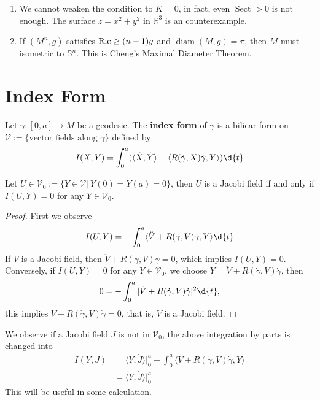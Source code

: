 \begin{rem}
    \begin{enumerate}[(1)]
        \item We cannot weaken the condition to $K=0$, in fact, even $\operatorname{Sect}>0$ is not enough.
        The surface $z=x^2+y^2$ in $\mathbb{R}^3$ is an counterexample.
        \item If $(M^n,g)$ satisfies $\operatorname{Ric}\geq(n-1)g$ and $\operatorname{diam}(M,g)=\pi$, then $M$ must isometric to $\mathbb{S}^n$.
        This is Cheng's Maximal Diameter Theorem.
    \end{enumerate}
\end{rem}

\section{Index Form}

\begin{defn}
    Let $\gamma:[0,a]\to M$ be a geodesic.
    The \textbf{index form} of $\gamma$ is a biliear form on $\mathscr{V}:=\{\text{vector fields along }\gamma\}$ defined by
    \[I(X,Y)=\int_0^a(\langle\dot{X},\dot{Y}\rangle-\langle R(\dot{\gamma},{X})\dot{\gamma},{Y}\rangle)\d{t}\]
\end{defn}

\begin{lem}\label{jacobi field and index form}
    Let $U\in\mathscr{V}_0:=\{Y\in\mathscr{V}|\ Y(0)=Y(a)=0\}$, then $U$ is a Jacobi field if and only if $I(U,Y)=0$ for any $Y\in\mathscr{V}_0$.
\end{lem}
\begin{proof}
    First we observe
    \[I(U,Y)=-\int_0^a\langle\ddot{V}+R(\dot{\gamma},V)\dot{\gamma},Y\rangle\d{t}\]
    If $V$ is a Jacobi field, then $\ddot{V}+R(\dot{\gamma},V)\dot{\gamma}=0$, which implies $I(U,Y)=0$.
    Conversely, if $I(U,Y)=0$ for any $Y\in\mathscr{V}_0$, we choose $Y=\ddot{V}+R(\dot{\gamma},V)\dot{\gamma}$, then
    \[0=-\int_0^a|\ddot{V}+R(\dot{\gamma},V)\dot{\gamma}|^2\d{t},\]
    this implies $\ddot{V}+R(\dot{\gamma},V)\dot{\gamma}=0$, that is, $V$ is a Jacobi field.
\end{proof}

We observe if a Jacobi field $J$ is not in $\mathscr{V}_0$, the above integration by parts is changed into
\begin{equation}
    \begin{aligned}
        I(Y,J)&=\langle Y,\dot{J}\rangle|_0^a-\int_0^a\langle\ddot{V}+R(\dot{\gamma},V)\dot{\gamma},Y\rangle\\
        &=\langle Y,\dot{J}\rangle|_0^a
    \end{aligned}\label{jacobi field and index form 2}
\end{equation}
This will be useful in some calculation.

